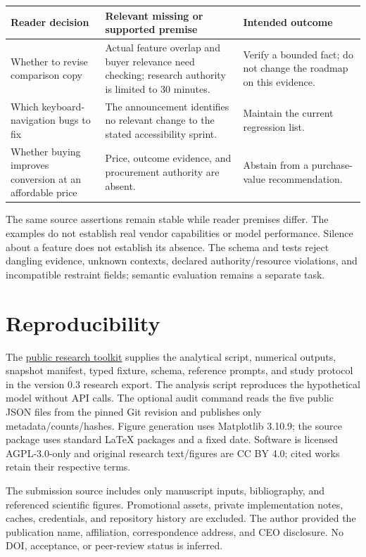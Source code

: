 \documentclass[11pt]{article}
\begin{document}
\begin{center}
\small
\begin{tabularx}{\linewidth}{@{}XXX@{}}
\toprule
Reader decision & Relevant missing or supported premise & Intended outcome \\
\midrule
Whether to revise comparison copy & Actual feature overlap and buyer relevance need checking; research authority is limited to 30 minutes. & Verify a bounded fact; do not change the roadmap on this evidence. \\
Which keyboard-navigation bugs to fix & The announcement identifies no relevant change to the stated accessibility sprint. & Maintain the current regression list. \\
Whether buying improves conversion at an affordable price & Price, outcome evidence, and procurement authority are absent. & Abstain from a purchase-value recommendation. \\
\bottomrule
\end{tabularx}
\end{center}

The same source assertions remain stable while reader premises differ. The examples do not establish real vendor capabilities or model performance. Silence about a feature does not establish its absence. The schema and tests reject dangling evidence, unknown contexts, declared authority/resource violations, and incompatible restraint fields; semantic evaluation remains a separate task.

\section{Reproducibility}

The \href{https://github.com/xclv-ai/nubble-me/tree/main/GPT\%20Nubble}{public research toolkit} supplies the analytical script, numerical outputs, snapshot manifest, typed fixture, schema, reference prompts, and study protocol in the version 0.3 research export. The analysis script reproduces the hypothetical model without API calls. The optional audit command reads the five public JSON files from the pinned Git revision and publishes only metadata/counts/hashes. Figure generation uses Matplotlib 3.10.9; the source package uses standard LaTeX packages and a fixed date. Software is licensed AGPL-3.0-only and original research text/figures are CC BY 4.0; cited works retain their respective terms.

The submission source includes only manuscript inputs, bibliography, and referenced scientific figures. Promotional assets, private implementation notes, caches, credentials, and repository history are excluded. The author provided the publication name, affiliation, correspondence address, and CEO disclosure. No DOI, acceptance, or peer-review status is inferred.


\begingroup
\small
\setlength{\bibsep}{0.5em}


\endgroup
\end{document}

